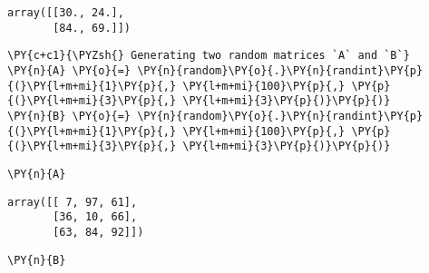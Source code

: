             \begin{tcolorbox}[breakable, size=fbox, boxrule=.5pt, pad at break*=1mm, opacityfill=0]
\begin{Verbatim}[commandchars=\\\{\}]
array([[30., 24.],
       [84., 69.]])
\end{Verbatim}
\end{tcolorbox}
        
    \begin{tcolorbox}[breakable, size=fbox, boxrule=1pt, pad at break*=1mm,colback=cellbackground, colframe=cellborder]
\begin{Verbatim}[commandchars=\\\{\}]
\PY{c+c1}{\PYZsh{} Generating two random matrices `A` and `B`}
\PY{n}{A} \PY{o}{=} \PY{n}{random}\PY{o}{.}\PY{n}{randint}\PY{p}{(}\PY{l+m+mi}{1}\PY{p}{,} \PY{l+m+mi}{100}\PY{p}{,} \PY{p}{(}\PY{l+m+mi}{3}\PY{p}{,} \PY{l+m+mi}{3}\PY{p}{)}\PY{p}{)}
\PY{n}{B} \PY{o}{=} \PY{n}{random}\PY{o}{.}\PY{n}{randint}\PY{p}{(}\PY{l+m+mi}{1}\PY{p}{,} \PY{l+m+mi}{100}\PY{p}{,} \PY{p}{(}\PY{l+m+mi}{3}\PY{p}{,} \PY{l+m+mi}{3}\PY{p}{)}\PY{p}{)}
\end{Verbatim}
\end{tcolorbox}

    \begin{tcolorbox}[breakable, size=fbox, boxrule=1pt, pad at break*=1mm,colback=cellbackground, colframe=cellborder]
\begin{Verbatim}[commandchars=\\\{\}]
\PY{n}{A}
\end{Verbatim}
\end{tcolorbox}

            \begin{tcolorbox}[breakable, size=fbox, boxrule=.5pt, pad at break*=1mm, opacityfill=0]
\begin{Verbatim}[commandchars=\\\{\}]
array([[ 7, 97, 61],
       [36, 10, 66],
       [63, 84, 92]])
\end{Verbatim}
\end{tcolorbox}
        
    \begin{tcolorbox}[breakable, size=fbox, boxrule=1pt, pad at break*=1mm,colback=cellbackground, colframe=cellborder]
\begin{Verbatim}[commandchars=\\\{\}]
\PY{n}{B}
\end{Verbatim}
\end{tcolorbox}

